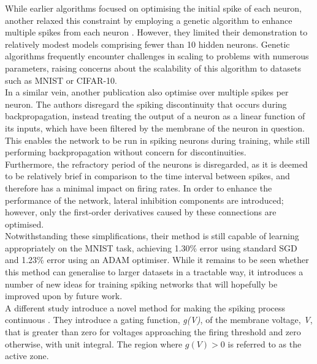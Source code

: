 \noindent While earlier algorithms focused on optimising the initial spike of each neuron, another relaxed this constraint by employing a genetic algorithm to enhance multiple spikes from each neuron \cite{stromatias2015supervised}. However, they limited their demonstration to relatively modest models comprising fewer than 10 hidden neurons. Genetic algorithms frequently encounter challenges in scaling to problems with numerous parameters, raising concerns about the scalability of this algorithm to datasets such as MNIST or CIFAR-10.\\

\noindent In a similar vein, another publication \cite{lee2016training} also optimise over multiple spikes per neuron. The authors disregard the spiking discontinuity that occurs during backpropagation, instead treating the output of a neuron as a linear function of its inputs, which have been filtered by the membrane of the neuron in question. This enables the network to be run in spiking neurons during training, while still performing backpropagation without concern for discontinuities. \\

\noindent Furthermore, the refractory period of the neurons is disregarded, as it is deemed to be relatively brief in comparison to the time interval between spikes, and therefore has a minimal impact on firing rates. In order to enhance the performance of the network, lateral inhibition components are introduced; however, only the first-order derivatives caused by these connections are optimised. \\

\noindent Notwithstanding these simplifications, their method is still capable of learning appropriately on the MNIST task, achieving 1.30\% error using standard SGD and 1.23\% error using an ADAM optimiser. While it remains to be seen whether this method can generalise to larger datasets in a tractable way, it introduces a number of new ideas for training spiking networks that will hopefully be improved upon by future work. \\

\noindent A different study introduce a novel method for making the spiking process continuous \cite{huh2018gradient}. They introduce a gating function, \textit{g(V)}, of the membrane voltage, \textit{V}, that is greater than zero for voltages approaching the firing threshold and zero otherwise, with unit integral. The region where $g(V) > 0$ is referred to as the active zone. \\

